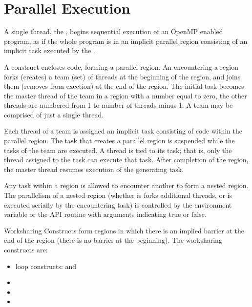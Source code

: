\pagebreak
\chapter{Parallel Execution}
\label{chap:parallel_execution}

A single thread, the , begins sequential execution of 
an OpenMP enabled program, as if the whole program is in an implicit parallel
region consisting of an implicit task executed by the .

A  construct encloses code, 
forming a parallel region.  An  encountering a  
region forks (creates) a team (set) of threads at the beginning of the 
 region, and joins them (removes from exection) at the 
end of the region.  The initial task becomes the master thread of the team in a 
 region with a  number equal to zero, the other 
threads are numbered from 1 to number of threads minus 1. 
A team may be comprised of just a single thread.

Each thread of a team is assigned an implicit task consisting of code within the 
parallel region. The task that creates a parallel region is suspended  while the
tasks of the team are executed.  A thread is tied to its task; that is,
only the thread assigned to the task can execute that task.  After completion 
of the  region, the master thread resumes execution of the generating task.  


Any task within a  region is allowed to encounter another
 to form a nested  region. The 
parallelism of a nested  region (whether is forks additional 
threads, or is executed serially by the encountering task) is controlled by the
 environment variable or the  
API routine with arguments indicating true or false.

Worksharing Constructs form regions in which there is an implied barrier at
the end of the region (there is no barrier at the beginning). The worksharing
constructs are:

\begin{itemize}

\item loop constructs: { and  }
\item {}
\item {}
\item {}

\end{itemize}

